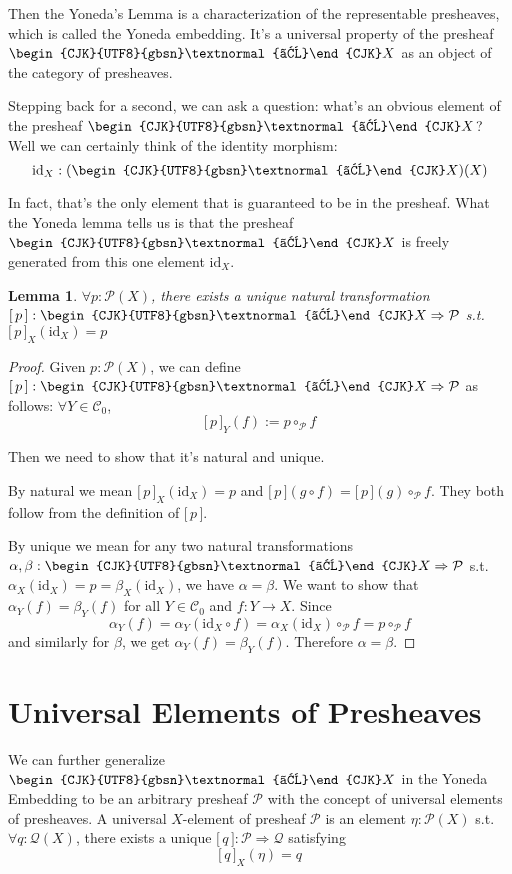 \documentclass[12pt]{article}
\newtheorem{lemma}{Lemma}
\theoremstyle{definition}
\theoremstyle{remark}
\newcommand{\cat}[1]{\mathcal{#1}}
\newcommand{\psh}[1]{\mathcal{#1}}
\newcommand{\yo}{\begin{CJK}{UTF8}{gbsn}\textnormal{よ}\end{CJK}}
\newcommand{\id}{\mathrm{id}}
\newcommand{\yotrans}[1]{\lbrack\,#1\,\rbrack}
\newcommand{\natrans}{\Rightarrow}
\begin{document}
Then the Yoneda's Lemma is a characterization of the representable presheaves, which is called the Yoneda embedding. It's a universal property of the presheaf $\yo X$ as an object of the category of presheaves.

Stepping back for a second, we can ask a question: what's an obvious element of the presheaf $\yo X$? Well we can certainly think of the identity morphism:
$$\id_X: (\yo X)(X)$$

In fact, that's the only element that is guaranteed to be in the presheaf. What the Yoneda lemma tells us is that the presheaf $\yo X$ is freely generated from this one element $\id_X$.

\begin{lemma}
  $\forall p : \psh{P}(X)$, there exists a unique natural transformation $\yotrans{p} : \yo X \natrans \psh{P}$ s.t. $\yotrans{p}_X(\id_X) = p$
\end{lemma}

\begin{proof}
  Given $p : \psh{P}(X)$, we can define $\yotrans{p} : \yo X \natrans \psh{P}$ as follows: $\forall Y \in \cat{C}_0$,
  $$
    \yotrans{p}_Y(f) := p \circ_\psh{P} f
  $$

  Then we need to show that it's natural and unique.
  
  By natural we mean $\yotrans{p}_X(\id_X) = p$ and $\yotrans{p} (g \circ f) = \yotrans{p} (g) \circ_\psh{P} f$. They both follow from the definition of $\yotrans{p}$.

  By unique we mean for any two natural transformations $\alpha, \beta: \yo X \natrans \psh{P}$ s.t. $\alpha_X(\id_X) = p = \beta_X(\id_X)$, we have $\alpha = \beta$. We want to show that $\alpha_Y(f) = \beta_Y(f)$ for all $Y \in \cat{C}_0$ and $f: Y \to X$. Since
  $$
  \alpha_Y(f) = \alpha_Y(\id_X \circ f) = \alpha_X(\id_X) \circ_\psh{P} f = p \circ_\psh{P} f
  $$
  and similarly for $\beta$, we get $\alpha_Y(f) = \beta_Y(f)$. Therefore $\alpha = \beta$.
\end{proof}

\section{Universal Elements of Presheaves}

We can further generalize $\yo X$ in the Yoneda Embedding to be an arbitrary presheaf $\psh{P}$ with the concept of universal elements of presheaves.
A universal $X$-element of presheaf $\psh{P}$ is an element $\eta: \psh{P}(X)$ s.t. $\forall q: \psh{Q}(X)$, there exists a unique $\yotrans{q}: \psh{P} \natrans \psh{Q}$ satisfying
$$
  \yotrans{q}_X(\eta) = q
$$
\end{document}
